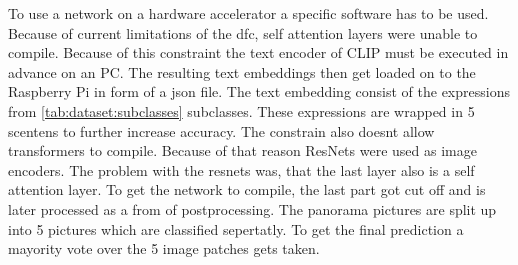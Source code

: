 To use a network on a hardware accelerator a specific software has to be used.
Because of current limitations of the \acrshort{dfc}, self attention layers were unable to compile.
Because of this constraint the text encoder of CLIP must be executed in advance on an PC.
The resulting text embeddings then get loaded on to the Raspberry Pi in form of a json file.
The text embedding consist of the expressions from \cref{tab:dataset:subclasses} subclasses.
These expressions are wrapped in 5 scentens to further increase accuracy.
The constrain also doesnt allow transformers to compile.
Because of that reason ResNets were used as image encoders.
The problem with the resnets was, that the last layer also is a self attention layer.
To get the network to compile, the last part got cut off and is later processed as a from of postprocessing.
The panorama pictures are split up into 5 pictures which are classified sepertatly.
To get the final prediction a mayority vote over the 5 image patches gets taken.

